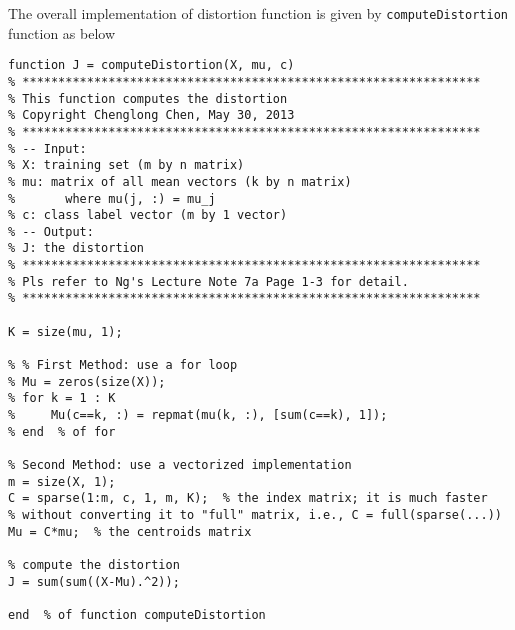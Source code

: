 \documentclass{article}
\begin{document}
The overall implementation of distortion function is given by \texttt{computeDistortion} function as below
\begin{verbatim}
function J = computeDistortion(X, mu, c)
% ****************************************************************
% This function computes the distortion
% Copyright Chenglong Chen, May 30, 2013
% ****************************************************************
% -- Input:
% X: training set (m by n matrix)
% mu: matrix of all mean vectors (k by n matrix)
%       where mu(j, :) = mu_j
% c: class label vector (m by 1 vector)
% -- Output:
% J: the distortion
% ****************************************************************
% Pls refer to Ng's Lecture Note 7a Page 1-3 for detail.
% ****************************************************************

K = size(mu, 1);

% % First Method: use a for loop
% Mu = zeros(size(X));
% for k = 1 : K
%     Mu(c==k, :) = repmat(mu(k, :), [sum(c==k), 1]);
% end  % of for

% Second Method: use a vectorized implementation
m = size(X, 1);
C = sparse(1:m, c, 1, m, K);  % the index matrix; it is much faster
% without converting it to "full" matrix, i.e., C = full(sparse(...))
Mu = C*mu;  % the centroids matrix

% compute the distortion
J = sum(sum((X-Mu).^2));

end  % of function computeDistortion
\end{verbatim}
\end{document}
